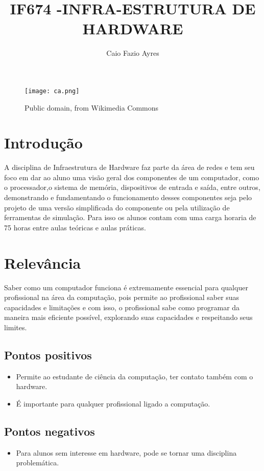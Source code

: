 \documentclass[a4paper, 10pt]{article}
\title{IF674 -INFRA-ESTRUTURA DE HARDWARE}
\author{Caio Fazio Ayres}
\begin{document}
\maketitle
\begin{figure} [h]
\centering
\texttt{[image: ca.png]}
\caption{Public domain, from Wikimedia Commons}
\end{figure}
\section{Introdução}

A disciplina de Infraestrutura de Hardware faz parte da área de redes e tem seu foco em dar ao aluno uma visão geral dos componentes de um computador, como o processador,o sistema de memória, dispositivos de entrada e saída, entre outros, demonstrando e fundamentando o funcionamento desses componentes seja pelo projeto de uma versão simplificada do componente ou pela utilização de ferramentas de simulação. Para isso os alunos contam com uma carga horaria de 75 horas entre aulas teóricas e aulas práticas. 

\section{Relevância}

Saber como um computador funciona é extremamente essencial para qualquer profissional na área da computação, pois permite ao profissional saber suas capacidades e limitações e com isso, o profissional sabe como programar da maneira mais eficiente possível, explorando suas capacidades e respeitando seus limites.

\subsection{Pontos positivos}
\begin{itemize}
\item Permite ao estudante de ciência da computação, ter contato também com o hardware.
\item É importante para qualquer profissional ligado a computação.
\end{itemize}
\subsection{Pontos negativos}
\begin{itemize}
\item Para alunos sem interesse em hardware, pode se tornar uma disciplina problemática.
\end{itemize}
\end{document}
